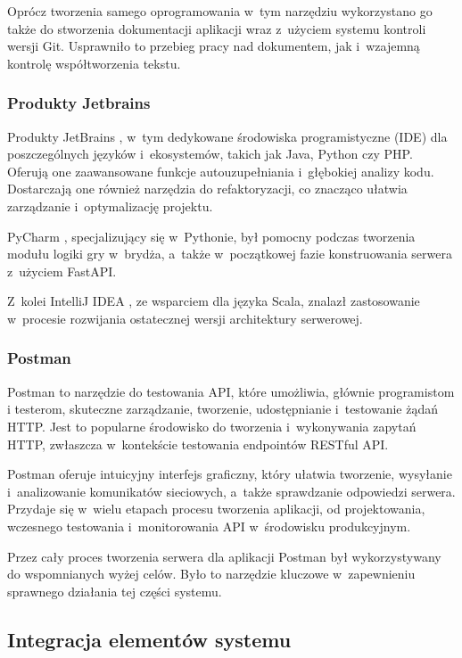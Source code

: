 Oprócz tworzenia samego oprogramowania w~tym narzędziu wykorzystano go także
do stworzenia dokumentacji aplikacji wraz z~użyciem systemu kontroli wersji Git.
Usprawniło to przebieg pracy nad dokumentem, jak i~wzajemną kontrolę
współtworzenia tekstu.


\subsubsection{Produkty Jetbrains}

Produkty JetBrains \cite{JetBrains}, w~tym dedykowane środowiska
programistyczne (IDE) dla poszczególnych języków i~ekosystemów,
takich jak Java, Python czy PHP.
Oferują one zaawansowane funkcje autouzupełniania i~głębokiej
analizy kodu. Dostarczają one również narzędzia do refaktoryzacji,
co znacząco ułatwia zarządzanie i~optymalizację projektu.

PyCharm \cite{PyCharm}, specjalizujący się w~Pythonie, był pomocny podczas tworzenia
modułu logiki gry w~brydża, a~także w~początkowej fazie konstruowania
serwera z~użyciem FastAPI.

Z~kolei IntelliJ IDEA \cite{Intellij}, ze wsparciem dla języka
Scala, znalazł zastosowanie w~procesie rozwijania ostatecznej wersji
architektury serwerowej.


\subsubsection{Postman}

Postman \cite{Postman} to narzędzie do testowania API, które umożliwia, głównie
programistom i testerom, skuteczne zarządzanie, tworzenie, udostępnianie
i~testowanie żądań HTTP. Jest to popularne środowisko do tworzenia
i~wykonywania zapytań HTTP, zwłaszcza w~kontekście testowania
endpointów RESTful API.

Postman oferuje intuicyjny interfejs graficzny, który ułatwia tworzenie,
wysyłanie i~analizowanie komunikatów sieciowych, a~także sprawdzanie
odpowiedzi serwera. Przydaje się w~wielu etapach procesu tworzenia
aplikacji, od projektowania, wczesnego testowania i~monitorowania API
w~środowisku produkcyjnym.

Przez cały proces tworzenia serwera dla aplikacji Postman był wykorzystywany
do wspomnianych wyżej celów. Było to narzędzie kluczowe w~zapewnieniu
sprawnego działania tej części systemu.


\subsection{Integracja elementów systemu}

